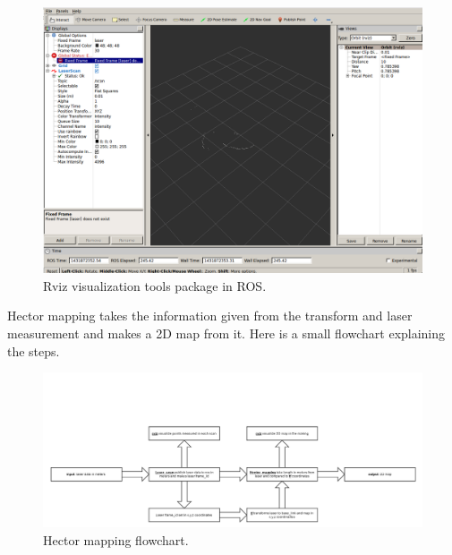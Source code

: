 \begin{figure}[H]
	\centering
	\includegraphics[width=.3\linewidth]{images/rviz.png}
	\caption{Rviz visualization tools package in ROS.}
\end{figure}

Hector mapping takes the information given from the transform and laser measurement and makes a 2D map from it. Here is a small flowchart explaining the steps.

\begin{figure}[H]
	\centering
	\includegraphics[width=.3\linewidth]{images/hector_flow.png}
	\caption{Hector mapping flowchart.}
\end{figure}

